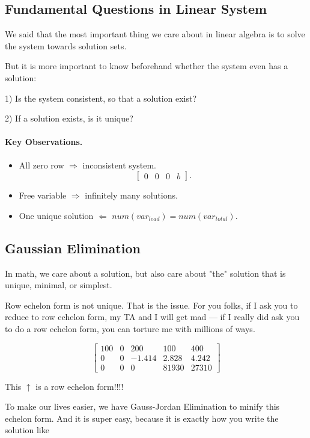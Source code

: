 \documentclass[11pt]{article}
\theoremstyle{definition}
\begin{document}
\subsection{Fundamental Questions in Linear System}
We said that the most important thing we care about in linear algebra is to solve the system towards solution sets.

But it is more important to know beforehand whether the system even has a solution:

1) Is the system consistent, so that a solution exist?

2) If a solution exists, is it unique?

\paragraph{Key Observations.} 

\begin{itemize}
    \item All zero row $\Rightarrow$ inconsistent system.
    \[
\left[
\begin{array}{ccc|c}
0 & 0 & 0 &b
\end{array}
\right].
\]
    \item Free variable $\Rightarrow$ infinitely many solutions.
    \item One unique solution $\Leftarrow$ $num(var_{lead}) = num(var_{total})$.
\end{itemize}

\subsection{Gaussian Elimination}
In math, we care about a solution, but also care about "the" solution that is unique, minimal, or simplest.

Row echelon form is not unique. That is the issue. For you folks, if I ask you to reduce to row echelon form, my TA and I will get mad --- if I really did ask you to do a row echelon form, you can torture me with millions of ways.

\[\left[
\begin{array}{cccc|c}
    100&0  & 200 & 100 & 400 \\
    0 & 0 & -1.414 & 2.828 & 4.242 \\
    0 & 0 & 0 & 81930 & 27310
\end{array}
\right]
\]

This $\uparrow$ is a row echelon form!!!!

To make our lives easier, we have Gauss-Jordan Elimination to minify this echelon form. And it is super easy, because it is exactly how you write the solution like 
\end{document}
